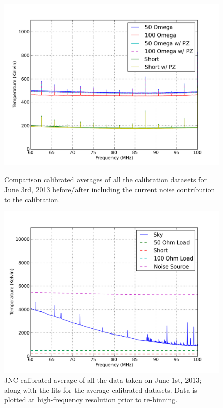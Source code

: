 \begin{figure}[htb]
\centering
\begin{minipage}[b]{0.48\textwidth}
\centering
\includegraphics[width=0.95\linewidth]{Data_analysis/figures/June_03_comp_test.png}
\caption{Comparison calibrated averages of all the calibration datasets for June 3rd, 2013 before/after including the current noise contribution to the calibration. }
\label{Fig:avg_cal_comp}
\end{minipage}%
\begin{minipage}[b]{0.02\textwidth}
\hspace{1cm}
\end{minipage}%
\begin{minipage}[b]{0.48\textwidth}
\centering
\includegraphics[width=0.95\linewidth]{Data_analysis/figures/June_01_mean_JNCcal_spectrum_full_ref.png}
\caption{JNC calibrated average of all the data taken on June 1st, 2013; along with the fits for the average calibrated datasets. Data is plotted at high-frequency resolution prior to re-binning. }
\label{Fig:avg_JNCcal_data}
\end{minipage}
\end{figure}

